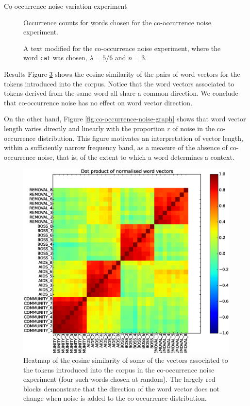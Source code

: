 \documentclass{article} %
\newcommand{\word}[1]{\texttt{#1}}
\begin{document}
\begin{section}{Co-occurrence noise variation experiment}
\begin{figure}
	
	\label{fig:co-occurrence-noise-counts}
	\caption{Occurrence counts for words chosen for the co-occurrence noise experiment. }
\end{figure}

\begin{figure}
	
	\caption{A text modified for the co-occurrence noise experiment, where the word \word{cat} was chosen, $\lambda = 5/6$ and $n=3$.}
\label{fig:co-occurrence-noise-experiment-text}
\end{figure}

\begin{subsection}{Results}
Figure \ref{fig:co-occurrence-noise-heatmap} shows the cosine similarity of the pairs of word vectors for the tokens introduced into the corpus.
Notice that the word vectors associated to tokens derived from the same word all share a common direction.
We conclude that co-occurrence noise has no effect on word vector direction.

On the other hand, Figure \ref{fig:co-occurrence-noise-graph} shows that word vector length varies directly and linearly with the proportion $r$ of noise in the co-occurrence distribution.
This figure motivates an interpretation of vector length, within a sufficiently narrow frequency band, as a measure of the absence of co-occurrence noise, that is, of the extent to which a word determines a context.


\begin{figure}\label{fig:co-occurrence-noise-heatmap}
	\includegraphics[scale=0.5]{cooccurrence-noise-heatmap}
	\caption{
	Heatmap of the cosine similarity of some of the vectors associated to the
	tokens introduced into the corpus in the co-occurrence noise experiment
	(four such words chosen at random).  The
	largely red blocks demonstrate that the direction of the word vector
	does not change when noise is added to the co-occurrence distribution.
	}
\end{figure}


\end{subsection}
\end{section}
\end{document}

